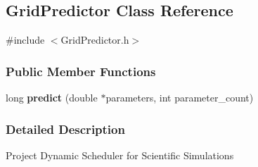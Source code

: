 \hypertarget{a00021}{}\subsection{Grid\+Predictor Class Reference}
\label{a00021}


{\ttfamily \#include $<$Grid\+Predictor.\+h$>$}

\subsubsection*{Public Member Functions}
\begin{DoxyCompactItemize}
\item 
\hypertarget{a00021_a357524a8315c708b29ec1b344c356995}{}long {\bfseries predict} (double $\ast$parameters, int parameter\+\_\+count)\label{a00021_a357524a8315c708b29ec1b344c356995}

\end{DoxyCompactItemize}


\subsubsection{Detailed Description}
Project Dynamic Scheduler for Scientific Simulations 